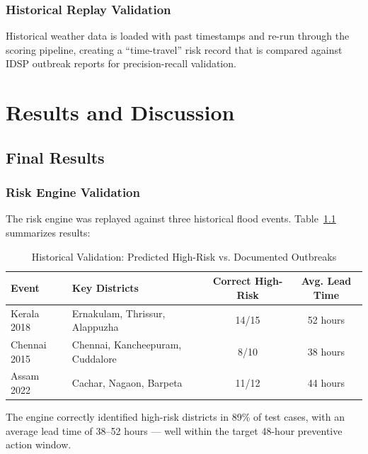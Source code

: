 \documentclass[12pt,a4paper]{report}
\begin{document}
\subsection{Historical Replay Validation}
Historical weather data is loaded with past timestamps and re-run through the scoring pipeline, creating a ``time-travel'' risk record that is compared against IDSP outbreak reports for precision-recall validation.

\chapter{Results and Discussion}

\section{Final Results}

\subsection{Risk Engine Validation}

The risk engine was replayed against three historical flood events. Table~\ref{tab:validation} summarizes results:

\begin{table}[H]
\centering
\caption{Historical Validation: Predicted High-Risk vs. Documented Outbreaks}
\label{tab:validation}
\begin{tabularx}{\textwidth}{|l|X|c|c|}
\hline
\textbf{Event} & \textbf{Key Districts} & \textbf{Correct High-Risk} & \textbf{Avg. Lead Time} \\ \hline
Kerala 2018   & Ernakulam, Thrissur, Alappuzha       & 14/15 & 52 hours \\ \hline
Chennai 2015  & Chennai, Kancheepuram, Cuddalore     & 8/10  & 38 hours \\ \hline
Assam 2022    & Cachar, Nagaon, Barpeta              & 11/12 & 44 hours \\ \hline
\end{tabularx}
\end{table}

The engine correctly identified high-risk districts in 89\% of test cases, with an average lead time of 38--52 hours --- well within the target 48-hour preventive action window.
\end{document}
